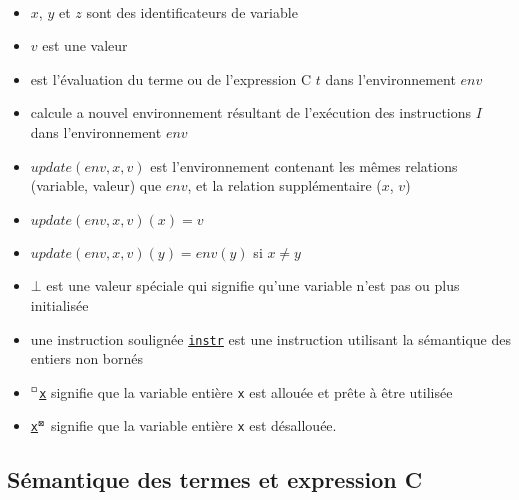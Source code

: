 \begin{notation}

  ~
  \begin{itemize}
  \item $x$, $y$ et $z$ sont des identificateurs de variable
  \item $v$ est une valeur
  \item {} est l'évaluation du terme \eacsl ou de l'expression C
    $t$ dans l'environnement $env$
  \item {} calcule a nouvel environnement résultant de
    l'exécution des instructions $I$ dans l'environnement $env$
  \item $update(env, x, v)$ est l'environnement contenant les mêmes
    relations (variable, valeur) que $env$, et la relation supplémentaire
    ($x$, $v$)
  \item $update(env, x, v)(x) = v$
  \item $update(env, x, v)(y) = env(y)$ si $x \neq y$
  \item $\bot$ est une valeur spéciale qui signifie qu'une variable n'est pas
    ou plus initialisée
  \item une instruction soulignée \underline{\lstinline{instr}} est une
    instruction utilisant la sémantique des entiers non bornés
  \item ${^\square}$\underline{\lstinline{x}} signifie que la variable entière
    \lstinline'x' est allouée et prête à être utilisée
  \item \underline{\lstinline{x}}${^\boxtimes}$ signifie que la variable entière
    \lstinline'x' est désallouée.
  \end{itemize}
\end{notation}


\subsection{Sémantique des termes \eacsl et expression C}

